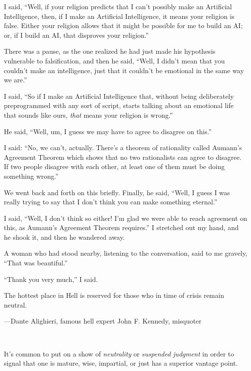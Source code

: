 {
 I said, ``Well, if your religion predicts that I
can't possibly make an Artificial Intelligence, then,
if I make an Artificial Intelligence, it means your religion is false.
Either your religion allows that it might be possible for me to build
an AI; or, if I build an AI, that disproves your
religion.''}

{
 There was a pause, as the one realized he had just made his
hypothesis vulnerable to falsification, and then he said,
``Well, I didn't mean that you
couldn't make an intelligence, just that it
couldn't be emotional in the same way we
are.''}

{
 I said, ``So if I make an Artificial Intelligence
that, without being deliberately preprogrammed with any sort of script,
starts talking about an emotional life that sounds like ours,
\textit{that} means your religion is wrong.''}

{
 He said, ``Well, um, I guess we may have to agree
to disagree on this.''}

{
 I said: ``No, we can't, actually.
There's a theorem of rationality called
Aumann's Agreement Theorem which shows that no two
rationalists can agree to disagree. If two people disagree with each
other, at least one of them must be doing something
wrong.''}

{
 We went back and forth on this briefly. Finally, he said,
``Well, I guess I was really trying to say that I
don't think you can make something
eternal.''}

{
 I said, ``Well, I don't think so
either! I'm glad we were able to reach agreement on
this, as Aumann's Agreement Theorem
requires.'' I stretched out my hand, and he shook it,
and then he wandered away.}

{
 A woman who had stood nearby, listening to the conversation, said
to me gravely, ``That was
beautiful.''}

{
 ``Thank you very much,'' I
said.}

\myendsectiontext


{
 The hottest place in Hell is reserved for those who in time of
crisis remain neutral.}

{\raggedleft
 {}---Dante Alighieri, famous hell expert\newline
 John F. Kennedy, misquoter
\par}


\bigskip

{
 ~}

{
 It's common to put on a show of
\textit{neutrality} or \textit{suspended judgment} in order to signal
that one is mature, wise, impartial, or just has a superior vantage
point.}

